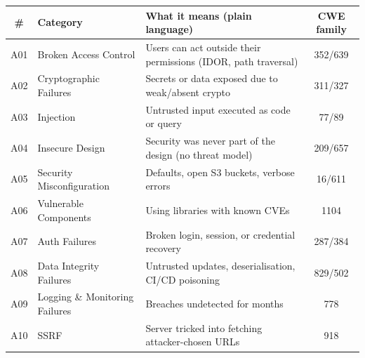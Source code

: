 \begin{center}
\small
\begin{tabular}{clp{7.5cm}c}
\toprule
\# & Category & What it means (plain language) & CWE family\\
\midrule
A01 & Broken Access Control & Users can act outside their permissions (IDOR, path traversal) & 352/639\\
A02 & Cryptographic Failures & Secrets or data exposed due to weak/absent crypto & 311/327\\
A03 & Injection & Untrusted input executed as code or query & 77/89\\
A04 & Insecure Design & Security was never part of the design (no threat model) & 209/657\\
A05 & Security Misconfiguration & Defaults, open S3 buckets, verbose errors & 16/611\\
A06 & Vulnerable Components & Using libraries with known CVEs & 1104\\
A07 & Auth Failures & Broken login, session, or credential recovery & 287/384\\
A08 & Data Integrity Failures & Untrusted updates, deserialisation, CI/CD poisoning & 829/502\\
A09 & Logging \& Monitoring Failures & Breaches undetected for months & 778\\
A10 & SSRF & Server tricked into fetching attacker-chosen URLs & 918\\
\bottomrule
\end{tabular}
\end{center}

